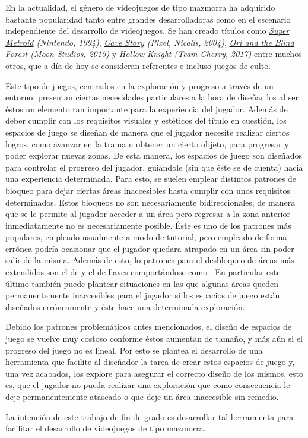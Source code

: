 En la actualidad, el género de videojuegos de tipo mazmorra ha adquirido bastante popularidad tanto entre grandes desarrolladoras como en el escenario independiente del desarrollo de videojuegos. Se han creado títulos como \textit{\href{https://www.nintendo.es/Juegos/Super-Nintendo/Super-Metroid-279613.html}{Super Metroid} (Nintendo, 1994)}, \textit{\href{https://www.cavestory.org/}{Cave Story} (Pixel, Nicalis, 2004)}, \textit{\href{https://www.orithegame.com/blind-forest/}{Ori and the Blind Forest} (Moon Studios, 2015)} y \textit{\href{https://hollowknight.com/}{Hollow Knight} (Team Cherry, 2017)} entre muchos otros, que a día de hoy se consideran referentes e incluso juegos de culto.\newline

Este tipo de juegos, centrados en la exploración y progreso a través de un entorno, presentan ciertas necesidades particulares a la hora de diseñar los  al ser éstos un elemento tan importante para la experiencia del jugador.
Además de deber cumplir con los requisitos visuales y estéticos del título en cuestión, los espacios de juego se diseñan de manera que el jugador necesite realizar ciertos logros, como avanzar en la trama u obtener un cierto objeto, para progresar y poder explorar nuevas zonas. De esta manera, los espacios de juego son diseñados para controlar el progreso del jugador, guiándole (sin que éste se de cuenta) hacia una experiencia determinada.\newline
Para esto, se suelen emplear distintos patrones de bloqueo para dejar ciertas áreas inaccesibles hasta cumplir con unos requisitos determinados.\newline
Estos bloqueos no son necesariamente bidireccionales, de manera que se le permite al jugador acceder a un área pero regresar a la zona anterior inmediatamente no es necesariamente posible. Éste es uno de los patrones más populares, empleado usualmente a modo de tutorial, pero empleado de forma errónea podría ocasionar que el jugador quedara atrapado en un área sin poder salir de la misma.\newline
Además de esto, lo patrones para el desbloqueo de áreas más extendidos son el de  y el de llaves comportándose como . En particular este último también puede plantear situaciones en las que algunas áreas queden permanentemente inaccesibles para el jugador si los espacios de juego están diseñados erróneamente y éste hace una determinada exploración.\newline

Debido los patrones problemáticos antes mencionados, el diseño de espacios de juego se vuelve muy costoso conforme éstos aumentan de tamaño, y más aún si el progreso del juego no es lineal. Por esto se plantea el desarrollo de una herramienta que facilite al diseñador la tarea de crear estos espacios de juego y, una vez acabados, los explore para asegurar el correcto diseño de los mismos, esto es, que el jugador no pueda realizar una exploración que como consecuencia le deje permanentemente atascado o que deje un área inaccesible sin remedio.

La intención de este trabajo de fin de grado es desarrollar tal herramienta para facilitar el desarrollo de videojuegos de tipo mazmorra.